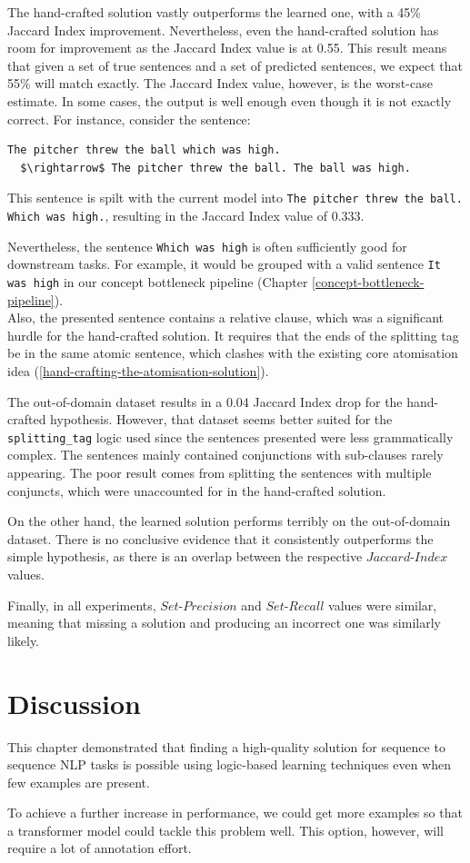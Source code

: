 The hand-crafted solution vastly outperforms the learned one, with a 45\% Jaccard Index improvement.
Nevertheless, even the hand-crafted solution has room for improvement as the Jaccard Index value is at 0.55.
This result means that given a set of true sentences and a set of predicted sentences, we expect that 55\% will match exactly.
The Jaccard Index value, however, is the worst-case estimate.
In some cases, the output is well enough even though it is not exactly correct.
For instance, consider the sentence:
\begin{lstlisting}
The pitcher threw the ball which was high. 
  $\rightarrow$ The pitcher threw the ball. The ball was high.
\end{lstlisting}
This sentence is spilt with the current model into \verb+The pitcher threw the ball.+ \verb+Which was high.+, resulting in the Jaccard Index value of 0.333.

Nevertheless, the sentence \verb+Which was high+ is often sufficiently good for downstream tasks.
For example, it would be grouped with a valid sentence \verb+It was high+ in our concept bottleneck pipeline (Chapter \ref{concept-bottleneck-pipeline}). \\
Also, the presented sentence contains a relative clause, which was a significant hurdle for the hand-crafted solution.
It requires that the ends of the splitting tag be in the same atomic sentence, which clashes with the existing core atomisation idea (\ref{hand-crafting-the-atomisation-solution}).


The out-of-domain dataset results in a 0.04 Jaccard Index drop for the hand-crafted hypothesis.
However, that dataset seems better suited for the \verb+splitting_tag+ logic used since the sentences presented were less grammatically complex.
The sentences mainly contained conjunctions with sub-clauses rarely appearing.
The poor result comes from splitting the sentences with multiple conjuncts, which were unaccounted for in the hand-crafted solution.

On the other hand, the learned solution performs terribly on the out-of-domain dataset.
There is no conclusive evidence that it consistently outperforms the simple hypothesis, as there is an overlap between the respective $Jaccard$-$Index$ values.

Finally, in all experiments, $Set$-$Precision$ and $Set$-$Recall$ values were similar, meaning that missing a solution and producing an incorrect one was similarly likely.


\section{Discussion}

This chapter demonstrated that finding a high-quality solution for sequence to sequence NLP tasks is possible using logic-based learning techniques even when few examples are present.

To achieve a further increase in performance,  we could get more examples so that a transformer model could tackle this problem well.
This option, however, will require a lot of annotation effort.
